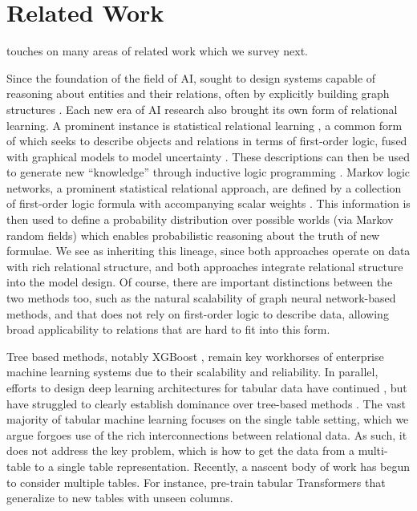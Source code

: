 \section{Related Work}\label{sec: related work}

\AreaName touches on many areas of related work which we survey next.

 Since the foundation of the field of AI, sought to design systems capable of reasoning about entities and their relations, often by explicitly building graph structures \citep{minsky1974framework}. Each new era of AI research also brought its own form of relational learning. A prominent instance is statistical relational learning \citep{de2008logical}, a common form of which seeks to describe objects and relations in terms of first-order logic, fused with graphical models to model uncertainty \citep{getoor2001learning}. These descriptions can then be used to generate new ``knowledge'' through inductive logic programming \citep{lavrac1994inductive}. Markov logic networks, a prominent statistical relational approach, are defined by a collection of first-order logic formula with accompanying scalar weights \citep{richardson2006markov}. This information is then used to  define a probability distribution over possible worlds (via Markov random fields) which enables probabilistic reasoning about the truth of new formulae. We see \AreaName as inheriting this lineage, since both approaches operate on data with rich relational structure, and both approaches integrate relational structure into the model design. Of course, there are important distinctions between the two methods too, such as the natural scalability of graph neural network-based methods, and that \AreaName does not rely on first-order logic to describe data, allowing broad applicability to relations that are hard to fit into this form. 



 Tree based methods, notably XGBoost \citep{chen2016xgboost}, remain key workhorses of enterprise machine learning systems due to their scalability and reliability. In parallel, efforts to design deep learning architectures for tabular data have continued \citep{huang2020tabtransformer,arik2021tabnet,gorishniy2021revisiting,gorishniy2022embeddings,chen2023trompt}, but have struggled to clearly establish dominance over tree-based methods \citep{shwartz2022tabular}. The vast majority of tabular machine learning focuses on the single table setting, which we argue forgoes use of the rich interconnections between relational data. As such, it does not address the key problem, which is how to get the data from a multi-table to a single table representation. Recently, a nascent body of work has begun to consider multiple tables. For instance, \cite{zhu2023xtab} pre-train tabular Transformers that generalize to new tables with unseen columns. 

